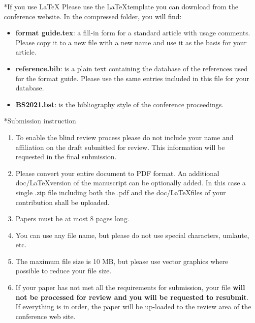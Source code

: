 \documentclass[twocolumn, a4paper,10pt]{article}
\makeatletter
\renewcommand\section{\@startsection{section}{1}{\z@}{3pt}{3pt}{\normalfont\large\bfseries}}
\makeatother
\begin{document}
\section*{If you use \LaTeX}
Please use the \LaTeX template you can download from the conference website. In the compressed folder, you will find:
\begin{itemize}
\item \textbf{format guide.tex}: a fill-in form for a standard article with usage comments. Please copy it to a new file with a new name and use it as the basis for your article.
\item \textbf{reference.bib}: is a plain text containing the database of the references used for the format guide. Please use the same entries included in this file for your database.
\item \textbf{BS2021.bst}: is the bibliography style of the conference proceedings. 
\end{itemize}
\section*{Submission instruction}
\begin{enumerate}
    \item To enable the blind review process please do not include your name and affiliation on the draft submitted for review. This information will be requested in the final submission.
    \item Please convert your entire document to PDF format. An additional doc/\LaTeX version of the manuscript can be optionally added. In this case a single .zip file including both the .pdf and the doc/\LaTeX files of your contribution shall be uploaded.
    \item Papers must be at most 8 pages long.
    \item You can use any file name, but please do not use special characters, umlaute, etc.
    \item The maximum file size is 10 MB, but please use vector graphics where possible to reduce your file size.
		\item If your paper has not met all the requirements for submission, your file \textbf{will not be processed for review and you will be requested to resubmit}. If everything is in order, the paper will be up-loaded to the review area of the conference web site.
\end{enumerate}
\end{document}
